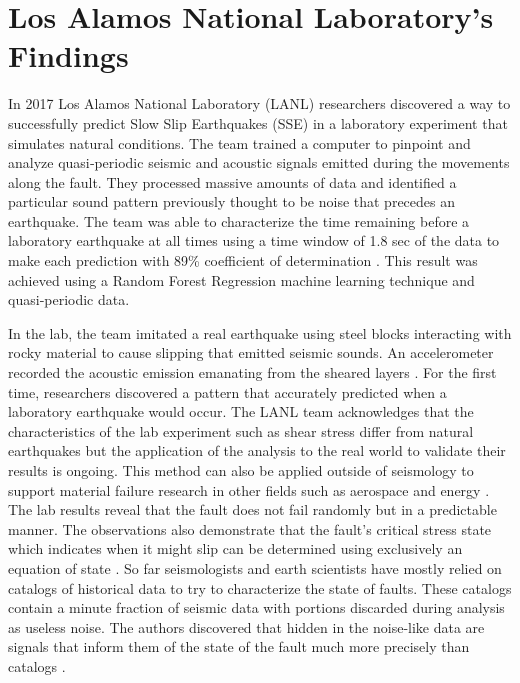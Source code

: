 \documentclass[]{llncs} %
\begin{document}
\section{Los Alamos National Laboratory's Findings}
In 2017 Los Alamos National Laboratory (LANL) researchers discovered a way to successfully predict Slow Slip Earthquakes (SSE) in a laboratory experiment that simulates natural conditions. The team trained a computer to pinpoint and analyze quasi‐periodic seismic and acoustic signals emitted during the movements along the fault. They processed massive amounts of data and identified a particular sound pattern previously thought to be noise that precedes an earthquake. The team was able to characterize the time remaining before a laboratory earthquake at all times using a time window of 1.8 sec of the data to make each prediction with 89\% coefficient of determination \cite{LANLNews}. This result was achieved using a Random Forest Regression machine learning technique and quasi‐periodic data. \par
In the lab, the team imitated a real earthquake using steel blocks interacting with rocky material to cause slipping that emitted seismic sounds. An accelerometer recorded the acoustic emission emanating from the sheared layers \cite{LANLNews}. For the first time, researchers discovered a pattern that accurately predicted when a laboratory earthquake would occur. The LANL team acknowledges that the characteristics of the lab experiment such as shear stress differ from natural earthquakes but the application of the analysis to the real world to validate their results is ongoing. This method can also be applied outside of seismology to support material failure research in other fields such as aerospace and energy \cite{LANLNews}. The lab results reveal that the fault does not fail randomly but in a predictable manner. The observations also demonstrate that the fault’s critical stress state which indicates when it might slip can be determined using exclusively an equation of state \cite{LANLNews}. So far seismologists and earth scientists have mostly relied on catalogs of historical data to try to characterize the state of faults. These catalogs contain a minute fraction of seismic data with portions discarded during analysis as useless noise. The authors discovered that hidden in the noise-like data are signals that inform them of the state of the fault much more precisely than catalogs \cite{LANLNews}. \par
\end{document}
